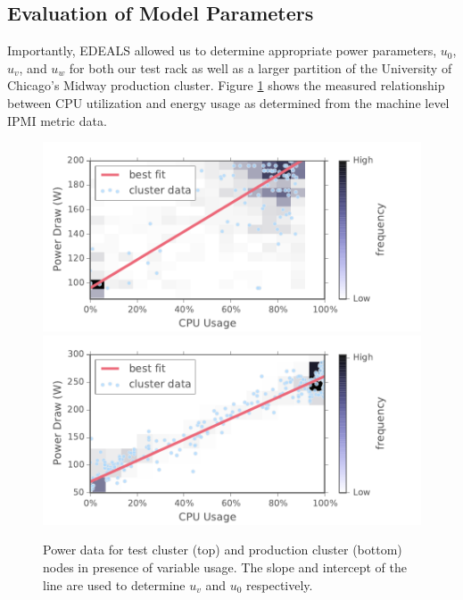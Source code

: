 \subsection{Evaluation of Model Parameters}

Importantly, EDEALS allowed us to determine appropriate power parameters, $u_0$, $u_v$, and $u_w$ for both our test rack as well as a larger partition of the University of Chicago's Midway production cluster.  Figure \ref{pwr_proc} shows the measured relationship between CPU utilization and energy usage as determined from the machine level IPMI metric data.


\begin{figure}[t]
	\begin{center}
		\includegraphics[scale=0.55]{edeals/pwr_proc}
		\includegraphics[scale=0.55]{edeals/pwr_proc_c}
	\end{center}
	\caption{Power data for test cluster (top) and production cluster (bottom) nodes in presence of variable usage. The slope and intercept of the line are used to determine $u_v$ and $u_0$ respectively. }
	\label{pwr_proc}
\end{figure}

